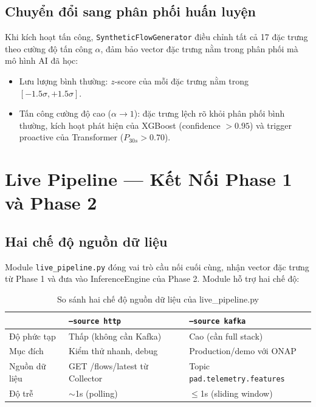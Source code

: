 \documentclass[12pt,a4paper]{article}
\begin{document}
\subsection{Chuyển đổi sang phân phối huấn luyện}

Khi kích hoạt tấn công, \texttt{SyntheticFlowGenerator} điều chỉnh tất cả 17 đặc trưng theo cường độ tấn công $\alpha$, đảm bảo vector đặc trưng nằm trong phân phối mà mô hình AI đã học:

\begin{itemize}[leftmargin=2em]
\item Lưu lượng bình thường: $z$-score của mỗi đặc trưng nằm trong $[-1.5\sigma, +1.5\sigma]$.
\item Tấn công cường độ cao ($\alpha \to 1$): đặc trưng lệch rõ khỏi phân phối bình thường, kích hoạt phát hiện của XGBoost (confidence $> 0.95$) và trigger proactive của Transformer ($P_{30s} > 0.70$).
\end{itemize}

\section{Live Pipeline --- Kết Nối Phase 1 và Phase 2}

\subsection{Hai chế độ nguồn dữ liệu}

Module \texttt{live\_pipeline.py} đóng vai trò cầu nối cuối cùng, nhận vector đặc trưng từ Phase 1 và đưa vào InferenceEngine của Phase 2. Module hỗ trợ hai chế độ:

\begin{table}[H]
\centering
\caption{So sánh hai chế độ nguồn dữ liệu của live\_pipeline.py}
\label{tab:source_modes}
\begin{tabular}{lp{5cm}p{5cm}}
\toprule
 & \textbf{\texttt{--source http}} & \textbf{\texttt{--source kafka}} \\
\midrule
Độ phức tạp & Thấp (không cần Kafka) & Cao (cần full stack) \\
Mục đích    & Kiểm thử nhanh, debug & Production/demo với ONAP \\
Nguồn dữ liệu & GET /flows/latest từ Collector & Topic \texttt{pad.telemetry.features} \\
Độ trễ      & $\sim$1s (polling) & $\leq$1s (sliding window) \\
\bottomrule
\end{tabular}
\end{table}
\end{document}
